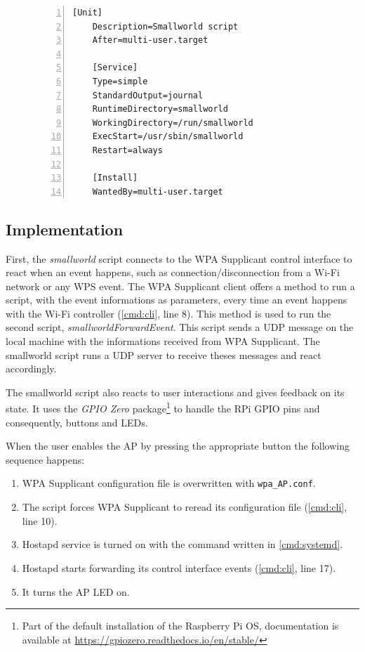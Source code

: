 \documentclass[a4paper,11pt,oneside]{report}
\begin{document}
\begin{figure}
\begin{lstlisting}[label=conf:service, caption=Service file for smallworld, numbers=left]
    [Unit]
    Description=Smallworld script
    After=multi-user.target

    [Service]
    Type=simple
    StandardOutput=journal
    RuntimeDirectory=smallworld
    WorkingDirectory=/run/smallworld
    ExecStart=/usr/sbin/smallworld
    Restart=always

    [Install]
    WantedBy=multi-user.target
\end{lstlisting}
\end{figure}

\subsection{Implementation}

First, the \emph{smallworld} script connects to the WPA Supplicant control interface to react when an event happens, such as connection/disconnection from a Wi-Fi network or any WPS event. The WPA Supplicant client offers a method to run a script, with the event informations as parameters, every time an event happens with the Wi-Fi controller (\autoref{cmd:cli}, line 8). This method is used to run the second script, \emph{smallworldForwardEvent}. This script sends a UDP message on the local machine with the informations received from WPA Supplicant. The smallworld script runs a UDP server to receive theses messages and react accordingly.

The smallworld script also reacts to user interactions and gives feedback on its state. It uses the \emph{GPIO Zero} package\footnote{Part of the default installation of the Raspberry Pi OS, documentation is available at \url{https://gpiozero.readthedocs.io/en/stable/}} to handle the RPi GPIO pins and consequently, buttons and LEDs.

When the user enables the AP by pressing the appropriate button the following sequence happens:
\begin{enumerate}
  \item WPA Supplicant configuration file is overwritten with \verb|wpa_AP.conf|.
  \item The script forces WPA Supplicant to reread its configuration file (\autoref{cmd:cli}, line 10).
  \item Hostapd service is turned on with the command written in \autoref{cmd:systemd}.
  \item Hostapd starts forwarding its control interface events (\autoref{cmd:cli}, line 17).
  \item It turns the AP LED on.
\end{enumerate}
\end{document}
